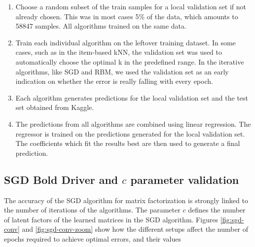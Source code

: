 \documentclass[10pt,conference,compsocconf]{IEEEtran}
\begin{document}
	\begin{enumerate}
		\item Choose a random subset of the train samples for a local validation set if not already chosen. This was in most cases 5\% of the data, which amounts to 58847 samples. All algorithms trained on the same data.
		
		
		\item Train each individual algorithm on the leftover training dataset. In some cases, such as in the item-based kNN, the validation set was used to automatically choose the optimal k in the predefined range. In the iterative algorithms, like SGD and RBM, we used the validation set as an early indication on whether the error is really falling with every epoch. 
		
		
		\item Each algorithm generates predictions for the local validation set and the test set obtained from Kaggle.
		
		\item The predictions from all algorithms are combined using linear regression. The regressor is trained on the predictions generated for the local validation set. The coefficients which fit the results best are then used to generate a final prediction.
		
	\end{enumerate}
	
	
	\subsection{SGD Bold Driver and $c$ parameter validation}
	The accuracy of the SGD algorithm for matrix factorization is strongly linked to the number of iterations of the algorithms. The parameter $c$ defines the number of latent factors of the learned matrices in the SGD algorithm. Figures \ref{fig:sgd-conv} and \ref{fig:sgd-conv-zoom} show how the different setups affect the number of epochs required to achieve optimal errors, and their values
	
\end{document}
